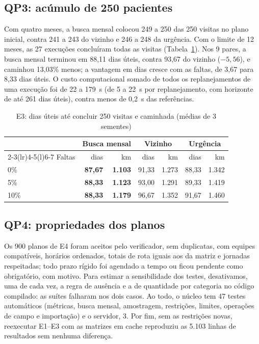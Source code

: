 \documentclass[conference,a4paper]{IEEEtran}
\begin{document}
\subsection{QP3: acúmulo de 250 pacientes}

Com quatro meses, a busca mensal colocou 249 a 250 das 250 visitas no plano inicial, contra 241 a 243 do vizinho e 246 a 248 da urgência. Com o limite de 12 meses, as 27 execuções concluíram todas as visitas (Tabela~\ref{tab:longo}). Nos 9 pares, a busca mensal terminou em 88,11 dias úteis, contra 93,67 do vizinho ($-5,56$), e caminhou 13,03\% menos; a vantagem em dias cresce com as faltas, de 3,67 para 8,33 dias úteis. O custo computacional somado de todos os replanejamentos de uma execução foi de 22 a 179~s (de 5 a 22~s por replanejamento, com horizonte de até 261 dias úteis), contra menos de 0,2~s das referências.

\begin{table}[t]
\centering
\caption{E3: dias úteis até concluir 250 visitas e caminhada (médias de 3 sementes)}
\label{tab:longo}
\footnotesize
\setlength{\tabcolsep}{4pt}
\begin{tabular}{@{}lrrrrrr@{}}
\toprule
& \multicolumn{2}{c}{Busca mensal} & \multicolumn{2}{c}{Vizinho} & \multicolumn{2}{c}{Urgência} \\
\cmidrule(lr){2-3}\cmidrule(lr){4-5}\cmidrule(l){6-7}
Faltas & dias & km & dias & km & dias & km \\
\midrule
0\% & \textbf{87,67} & \textbf{1.103} & 91,33 & 1.273 & 88,33 & 1.342 \\
5\% & \textbf{88,33} & \textbf{1.123} & 93,00 & 1.291 & 89,33 & 1.419 \\
10\% & \textbf{88,33} & \textbf{1.179} & 96,67 & 1.352 & 91,67 & 1.460 \\
\bottomrule
\end{tabular}
\end{table}

\subsection{QP4: propriedades dos planos}

Os 900 planos de E4 foram aceitos pelo verificador, sem duplicatas, com equipes compatíveis, horários ordenados, totais de rota iguais aos da matriz e jornadas respeitadas; todo prazo rígido foi agendado a tempo ou ficou pendente como obrigatório, com motivo. Para estimar a sensibilidade dos testes, desativamos, uma de cada vez, a regra de ausência e a de quantidade por categoria no código compilado: as suítes falharam nos dois casos. Ao todo, o núcleo tem 47 testes automáticos (métricas, busca mensal, amostragem, restrições, limites, operações de campo e importação) e o servidor, 3. Por fim, sem as restrições novas, reexecutar E1--E3 com as matrizes em cache reproduziu as 5.103 linhas de resultados sem nenhuma diferença.
\end{document}
